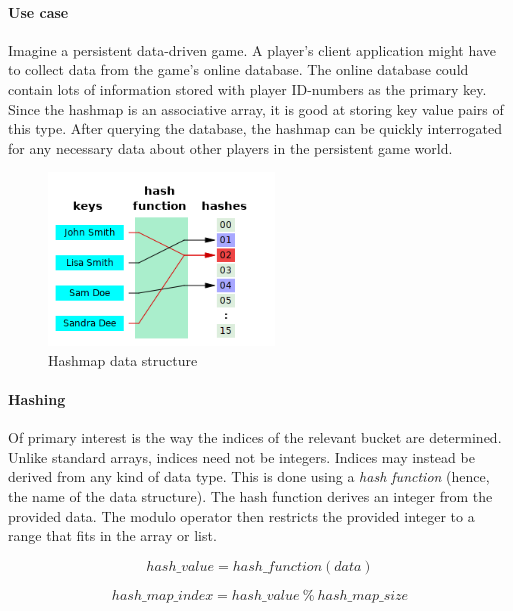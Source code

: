 \documentclass{article}
\begin{document}
\paragraph{Use case}
Imagine a persistent data-driven game. A player's client application might have to collect data from the game's online database.
The online database could contain lots of information stored with player ID-numbers as the primary key. Since the hashmap is an
associative array, it is good at storing key value pairs of this type. After querying the database, the hashmap can be quickly
interrogated for any necessary data about other players in the persistent game world.

\begin{figure}[H]
    \centering
    \includegraphics[width=6cm]{hash_map}
    \caption{Hashmap data structure}
\end{figure}

\paragraph{Hashing}
\begin{samepage}
  Of primary interest is the way the indices of the relevant bucket are determined. Unlike standard arrays,
  indices need not be integers. Indices may instead be derived from any kind of data type. This is done using
  a {\em hash function} (hence, the name of the data structure). The hash function derives an integer from the
  provided data. The modulo operator then restricts the provided integer to a range that fits in the array or list.
  
  \begin{equation}
    hash\_value = hash\_function(data)
  \end{equation}
  
  \begin{equation}
    hash\_map\_index = hash\_value \ \% \ hash\_map\_size
  \end{equation}
\end{samepage}
\end{document}
